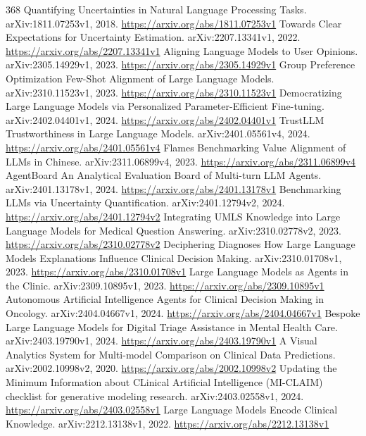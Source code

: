 \documentclass[11pt]{article}
\begin{document}
\begin{thebibliography}{368}
 Quantifying Uncertainties in Natural Language Processing Tasks. arXiv:1811.07253v1, 2018. \url{https://arxiv.org/abs/1811.07253v1}
 Towards Clear Expectations for Uncertainty Estimation. arXiv:2207.13341v1, 2022. \url{https://arxiv.org/abs/2207.13341v1}
 Aligning Language Models to User Opinions. arXiv:2305.14929v1, 2023. \url{https://arxiv.org/abs/2305.14929v1}
 Group Preference Optimization Few-Shot Alignment of Large Language Models. arXiv:2310.11523v1, 2023. \url{https://arxiv.org/abs/2310.11523v1}
 Democratizing Large Language Models via Personalized Parameter-Efficient Fine-tuning. arXiv:2402.04401v1, 2024. \url{https://arxiv.org/abs/2402.04401v1}
 TrustLLM Trustworthiness in Large Language Models. arXiv:2401.05561v4, 2024. \url{https://arxiv.org/abs/2401.05561v4}
 Flames Benchmarking Value Alignment of LLMs in Chinese. arXiv:2311.06899v4, 2023. \url{https://arxiv.org/abs/2311.06899v4}
 AgentBoard An Analytical Evaluation Board of Multi-turn LLM Agents. arXiv:2401.13178v1, 2024. \url{https://arxiv.org/abs/2401.13178v1}
 Benchmarking LLMs via Uncertainty Quantification. arXiv:2401.12794v2, 2024. \url{https://arxiv.org/abs/2401.12794v2}
 Integrating UMLS Knowledge into Large Language Models for Medical Question Answering. arXiv:2310.02778v2, 2023. \url{https://arxiv.org/abs/2310.02778v2}
 Deciphering Diagnoses How Large Language Models Explanations Influence Clinical Decision Making. arXiv:2310.01708v1, 2023. \url{https://arxiv.org/abs/2310.01708v1}
 Large Language Models as Agents in the Clinic. arXiv:2309.10895v1, 2023. \url{https://arxiv.org/abs/2309.10895v1}
 Autonomous Artificial Intelligence Agents for Clinical Decision Making in Oncology. arXiv:2404.04667v1, 2024. \url{https://arxiv.org/abs/2404.04667v1}
 Bespoke Large Language Models for Digital Triage Assistance in Mental Health Care. arXiv:2403.19790v1, 2024. \url{https://arxiv.org/abs/2403.19790v1}
 A Visual Analytics System for Multi-model Comparison on Clinical Data Predictions. arXiv:2002.10998v2, 2020. \url{https://arxiv.org/abs/2002.10998v2}
 Updating the Minimum Information about CLinical Artificial Intelligence (MI-CLAIM) checklist for generative modeling research. arXiv:2403.02558v1, 2024. \url{https://arxiv.org/abs/2403.02558v1}
 Large Language Models Encode Clinical Knowledge. arXiv:2212.13138v1, 2022. \url{https://arxiv.org/abs/2212.13138v1}

\end{thebibliography}
\end{document}
